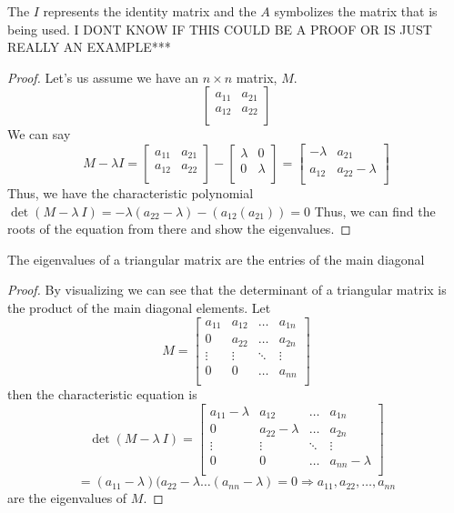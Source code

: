 The $I$ represents the identity matrix and the $A$ symbolizes the matrix that is being used.
I DONT KNOW IF THIS COULD BE A PROOF OR IS JUST REALLY AN EXAMPLE***
\begin{proof}
    Let's us assume we have an $n \times n$ matrix, $M$.  
   \[ \begin{bmatrix}
        a_{11}  &   a_{21} \\
        a_{12}  &   a_{22} \\
    \end{bmatrix} \]
We can say \[ M-\lambda I = \begin{bmatrix}
        a_{11}  &   a_{21}  \\
        a_{12}  &   a_{22}  \\
    \end{bmatrix} - \begin{bmatrix}
        \lambda     &   0   \\
        0           &   \lambda \\
    \end{bmatrix}
    = \begin{bmatrix}
        -\lambda    &   a_{21} \\
        a_{12}      &   a_{22} - \lambda \\
    \end{bmatrix}
    \]
Thus, we have the characteristic polynomial $\det(M-\lambda~I) = -\lambda(a_{22} - \lambda) - (a_{12}(a_{21})) = 0$ Thus, we can find the roots of the equation from there and show the eigenvalues.
\end{proof}
\begin{proposition}
    The eigenvalues of a triangular matrix are the entries of the main diagonal
\end{proposition}
\begin{proof}
    By visualizing we can see that the determinant of a triangular matrix is the product of the main diagonal elements. Let
    \[ M =
    \begin{bmatrix}
        a_{11}  &   a_{12}  &   \hdots  & a_{1n} \\
        0       &   a_{22}  &   \hdots  & a_{2n} \\
        \vdots  &   \vdots  & \ddots & \vdots \\
        0       &   0       &   \hdots  & a_{nn} \\
    \end{bmatrix}
    \] then the characteristic equation is 
    \[
        \det(M-\lambda~I) = \begin{bmatrix}
                                 a_{11} - \lambda &   a_{12}  &   \hdots  & a_{1n} \\
                                 0       &   a_{22} - \lambda  &   \hdots  & a_{2n} \\
                                 \vdots  &   \vdots   & \ddots & \vdots \\
                                 0       &   0       &   \hdots  & a_{nn} - \lambda \\
                             \end{bmatrix}\] \[= (a_{11} - \lambda)(a_{22}-\lambda \hdots (a_{nn} - \lambda) = 0  \Rightarrow a_{11}, a_{22}, \hdots, a_{nn} \] are the eigenvalues of $M$.
\end{proof}
